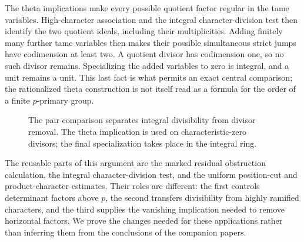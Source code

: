 The theta implications make every possible quotient factor regular in
the tame variables. High-character association and the integral
character-division test then identify the two quotient ideals, including
their multiplicities. Adding
finitely many further tame variables then makes their possible
simultaneous strict jumps have codimension at least two. A quotient
divisor has codimension one, so no such divisor remains. Specializing
the added variables to zero is integral, and a unit remains a unit.
This last fact is what permits an exact central comparison; the
rationalized theta construction is not itself read as a formula for
the order of a finite $p$-primary group.

\begin{figure}[htbp]
\centering
{}
\caption{The pair comparison separates integral divisibility from
divisor removal. The theta implication is used on characteristic-zero
divisors; the final specialization takes place in the integral ring.}
\label{fig:pair-comparison}
\end{figure}

The reusable parts of this argument are the marked residual
obstruction calculation, the integral character-division test, and the
uniform position-cut and product-character estimates. Their roles are
different: the first controls determinant factors above $p$, the
second transfers divisibility from highly ramified characters, and the
third supplies the vanishing implication needed to remove horizontal
factors. We prove the changes needed for these applications rather
than inferring them from the conclusions of the companion papers.

